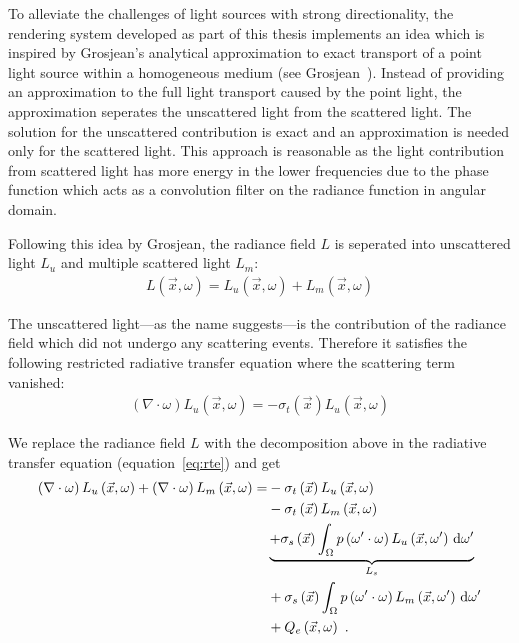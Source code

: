 To alleviate the challenges of light sources with strong directionality, the rendering system developed as part of this thesis implements an idea which is inspired by Grosjean’s analytical approximation to exact transport of a point light source within a homogeneous medium (see Grosjean~\cite{Grosjean56}). Instead of providing an approximation to the full light transport caused by the point light, the approximation seperates the unscattered light from the scattered light. The solution for the unscattered contribution is exact and an approximation is needed only for the scattered light. This approach is reasonable as the light contribution from scattered light has more energy in the lower frequencies due to the phase function which acts as a convolution filter on the radiance function in angular domain.

Following this idea by Grosjean, the radiance field $L$ is seperated into unscattered light $L_{u}$ and multiple scattered light $L_m$:
\begin{align}
L\left(\vec{x}, \omega\right) = 
L_u\left(\vec{x}, \omega\right)
+L_m\left(\vec{x}, \omega\right)
\end{align}

The unscattered light---as the name suggests---is the contribution of the radiance field which did not undergo any scattering events. Therefore it satisfies the following restricted radiative transfer equation where the scattering term vanished:
\begin{align}
\left(\nabla\cdot\omega\right)L_u\left(\vec{x}, \omega \right)
=
-\sigma_t\left(\vec{x}\right) L_u\left(\vec{x}, \omega \right)
\label{eq:restricted_rte}
\end{align}


We replace the radiance field $L$ with the decomposition above in the radiative transfer equation (equation~\ref{eq:rte}) and get
\begin{align}
\left(\nabla\cdot\omega\right)L_u\left(\vec{x}, \omega \right)
+\left(\nabla\cdot\omega\right)L_m\left(\vec{x}, \omega \right)
=&
-\sigma_t\left(\vec{x}\right) L_u\left(\vec{x}, \omega \right)
\nonumber\\
&
-\sigma_t\left(\vec{x}\right) L_m\left(\vec{x}, \omega \right)\nonumber\\
&
\underbrace
{
+\sigma_s\left(\vec{x}\right) \int_{\Omega}
{
p\left(\omega'\cdot\omega\right)L_u\left(\vec{x}, \omega' \right)\,\mathrm{d}\omega'
}
}_{L_s}
\nonumber\\
&
+\sigma_s\left(\vec{x}\right) \int_{\Omega}
{
p\left(\omega'\cdot\omega\right)L_m\left(\vec{x}, \omega' \right)\,\mathrm{d}\omega'
}
\nonumber
\\
&
+Q_e\left(\vec{x}, \omega\right)
\nonumber
\  .
\end{align}

